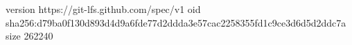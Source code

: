 version https://git-lfs.github.com/spec/v1
oid sha256:d79ba0f130d893d4d9a6fde77d2ddda3e57cac2258355fd1c9ce3d6d5d2ddc7a
size 262240
